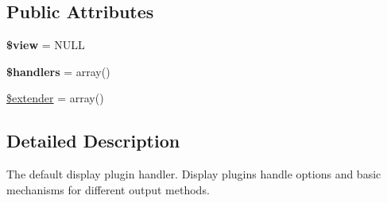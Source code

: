 \subsection*{Public Attributes}
\begin{DoxyCompactItemize}
\item 
\hypertarget{classviews__plugin__display_a78be22891ebea17c6c59233f39fac4f0}{
{\bfseries \$view} = NULL}
\label{classviews__plugin__display_a78be22891ebea17c6c59233f39fac4f0}

\item 
\hypertarget{classviews__plugin__display_a0922a139cadeb3529534b8772329e98d}{
{\bfseries \$handlers} = array()}
\label{classviews__plugin__display_a0922a139cadeb3529534b8772329e98d}

\item 
\hyperlink{classviews__plugin__display_afd824fc8476a1f6a916a99e4dbd975ca}{\$extender} = array()
\end{DoxyCompactItemize}


\subsection{Detailed Description}
The default display plugin handler. Display plugins handle options and basic mechanisms for different output methods. 

